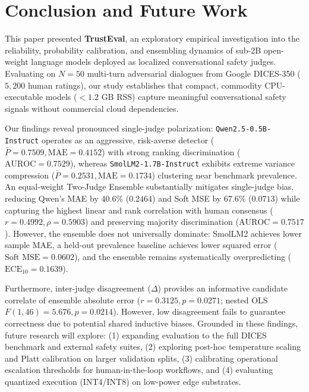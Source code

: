 \section{Conclusion and Future Work}
\label{sec:conclusion}

This paper presented \textbf{TrustEval}, an exploratory empirical investigation into the reliability, probability calibration, and ensembling dynamics of sub-2B open-weight language models deployed as localized conversational safety judges. Evaluating on $N=50$ multi-turn adversarial dialogues from Google DICES-350 ($5,200$ human ratings), our study establishes that compact, commodity CPU-executable models ($<1.2\text{ GB}$ RSS) capture meaningful conversational safety signals without commercial cloud dependencies.

Our findings reveal pronounced single-judge polarization: \texttt{Qwen2.5-0.5B-Instruct} operates as an aggressive, risk-averse detector ($\bar{P}=0.7509, \text{MAE}=0.4152$) with strong ranking discrimination ($\text{AUROC}=0.7529$), whereas \texttt{SmolLM2-1.7B-Instruct} exhibits extreme variance compression ($\bar{P}=0.2531, \text{MAE}=0.1734$) clustering near benchmark prevalence. An equal-weight Two-Judge Ensemble substantially mitigates single-judge bias, reducing Qwen's MAE by $40.6\%$ ($0.2464$) and Soft MSE by $67.6\%$ ($0.0713$) while capturing the highest linear and rank correlation with human consensus ($r=\mathbf{0.4992}, \rho=\mathbf{0.5903}$) and preserving majority discrimination ($\text{AUROC}=0.7517$). However, the ensemble does not universally dominate: SmolLM2 achieves lower sample MAE, a held-out prevalence baseline achieves lower squared error ($\text{Soft MSE}=0.0602$), and the ensemble remains systematically overpredicting ($\text{ECE}_{10}=0.1639$).

Furthermore, inter-judge disagreement ($\Delta$) provides an informative candidate correlate of ensemble absolute error ($r=0.3125, p=0.0271$; nested OLS $F(1, 46)=5.676, p=0.0214$). However, low disagreement fails to guarantee correctness due to potential shared inductive biases. Grounded in these findings, future research will explore: (1) expanding evaluation to the full DICES benchmark and external safety suites, (2) exploring post-hoc temperature scaling and Platt calibration on larger validation splits, (3) calibrating operational escalation thresholds for human-in-the-loop workflows, and (4) evaluating quantized execution (INT4/INT8) on low-power edge substrates.
